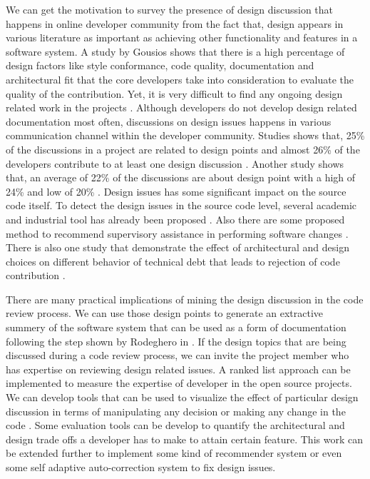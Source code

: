 We can get the motivation to survey the presence of design discussion that happens in online developer community from the fact that, design appears in various literature as important as achieving other functionality and features in a software system. A study by Gousios \cite{Gousios2015} shows that there is a high percentage of design factors like style conformance, code quality, documentation and architectural fit that the core developers take into consideration to evaluate the quality of the contribution. Yet, it is very difficult to find any ongoing design related work in the projects \cite{Brunet2014a}. Although developers do not develop design related documentation most often, discussions on design issues happens in various communication channel within the developer community. Studies shows that, 25\% of the discussions in a project are related to design points and almost 26\% of the developers contribute to at least one design discussion \cite{Brunet2014a}. Another study shows that, an average of 22\% of the discussions are about design point with a high of 24\% and low of 20\% \cite{Viviani2018}. Design issues has some significant impact on the source code itself. To detect the design issues in the source code level, several academic and industrial tool has already been proposed \cite{Sousa2018}. Also there are some proposed method to recommend supervisory assistance in performing software changes \cite{Kagdi2008}. There is also one study that demonstrate the effect of architectural and design choices on different behavior of technical debt that leads to rejection of code contribution \cite{Curtis2012a}.

There are many practical implications of mining the design discussion in the code review process. We can use those design points to generate an extractive summery of the software system that can be used as a form of documentation following the step shown by Rodeghero in \cite{Rod2017}. If the design topics that are being discussed during a code review process, we can invite the project member who has expertise on reviewing design related issues. A ranked list approach \cite{Kagdi2008} can be implemented to measure the expertise of developer in the open source projects. We can develop tools that can be used to visualize the effect of particular design discussion in terms of manipulating any decision or making any change in the code \cite{Viviani2018a}. Some evaluation tools can be develop to quantify the architectural and design trade offs a developer has to make to attain certain feature. This work can be extended further to implement some kind of recommender system or even some self adaptive auto-correction system to fix design issues.

